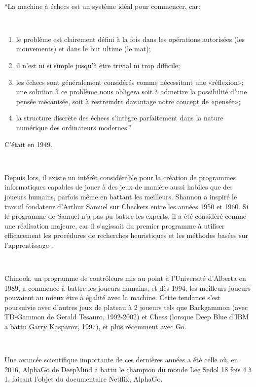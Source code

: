 ~\par
“La machine à échecs est un système idéal pour commencer, car: 

~\par
\begin{enumerate}
\item le problème est clairement défini à la fois dans les opérations autorisées (les mouvements) et dans le but ultime (le mat); 
\item il n'est ni si simple jusqu'à être trivial ni trop difficile; 
\item les échecs sont généralement considérés comme nécessitant une «réflexion»; une solution à ce problème nous obligera soit à admettre la possibilité d'une pensée mécanisée, soit à restreindre davantage notre concept de «pensée»; 
\item la structure discrète des échecs s’intègre parfaitement dans la nature numérique des ordinateurs modernes.”

\end{enumerate}

C'était en 1949.

~\par
Depuis lors, il existe un intérêt considérable pour la création de programmes informatiques capables de jouer à des jeux de manière aussi habiles que des joueurs humains, parfois même en battant les meilleurs. Shannon a inspiré le travail fondateur d’Arthur Samuel sur Checkers entre les années 1950 et 1960. Si le programme de Samuel n’a pas pu battre les experts, il a été considéré comme une réalisation majeure, car il s’agissait du premier programme à utiliser efficacement les procédures de recherches heuristiques et les méthodes basées sur l’apprentissage \parencite{unity1}.


~\par
Chinook, un programme de contrôleurs mis au point à l’Université d'Alberta en 1989, a commencé à battre les joueurs humains, et dès 1994, les meilleurs joueurs pouvaient au mieux être à égalité avec la machine. Cette tendance s’est poursuivie avec d’autres jeux de plateau à 2 joueurs tels que Backgammon (avec TD-Gammon de Gerald Tesauro, 1992-2002) et Chess (lorsque Deep Blue d’IBM a battu Garry Kasparov, 1997), et plus récemment avec Go.

~\par
Une avancée scientifique importante de ces dernières années a été celle où, en 2016, AlphaGo de DeepMind a battu le champion du monde Lee Sedol 18 fois 4 à 1, faisant l’objet du documentaire Netflix, AlphaGo. 


